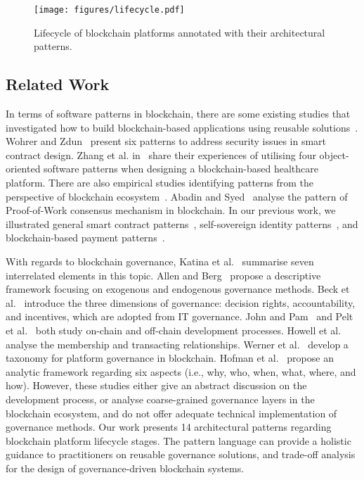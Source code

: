 \documentclass{article}
\begin{document}
\begin{figure*}[!ht]
	\centering
	\texttt{[image: figures/lifecycle.pdf]}
	\caption{Lifecycle of blockchain platforms annotated with their architectural patterns.}
	\label{fig:lifecycle}
\end{figure*}



\subsection{Related Work}

In terms of software patterns in blockchain, there are some existing studies that investigated how to build blockchain-based applications using reusable solutions~\cite{xu2018pattern, oracle, eberhardt2017or}. Wohrer and Zdun~\cite{wohrer2018smart} present six patterns to address security issues in smart contract design. Zhang et al. in~\cite{zhang2017applying} share their experiences of utilising four object-oriented software patterns when designing a blockchain-based healthcare platform. There are also empirical studies identifying patterns from the perspective of blockchain ecosystem~\cite{bartoletti2017empirical, Wohrer_Zdun}. Abadin and Syed~\cite{PoW_pattern} analyse the pattern of Proof-of-Work consensus mechanism in blockchain. In our previous work, we illustrated general smart contract patterns~\cite{smartContractICBC}, self-sovereign identity patterns~\cite{SSIpattern}, and blockchain-based payment patterns~\cite{lu2021patterns}.


With regards to blockchain governance, Katina et al.~\cite{selected5} summarise seven interrelated elements in this topic. Allen and Berg~\cite{selected7} propose a descriptive framework focusing on exogenous and endogenous governance methods. Beck et al.~\cite{selected14} introduce the three dimensions of governance: decision rights, accountability, and incentives, which are adopted from IT governance. John and Pam~\cite{selected10} and Pelt et al.~\cite{selected11} both study on-chain and off-chain development processes. Howell et al.~\cite{selected15} analyse the membership and transacting relationships. Werner et al.~\cite{selected31} develop a taxonomy for platform governance in blockchain. Hofman et al.~\cite{hofman2021blockchain} propose an analytic framework regarding six aspects (i.e., why, who, when, what, where, and how). However, these studies either give an abstract discussion on the development process, or analyse coarse-grained governance layers in the blockchain ecosystem, and do not offer adequate technical implementation of governance methods. Our work presents 14 architectural patterns regarding blockchain platform lifecycle stages. The pattern language can provide a holistic guidance to practitioners on reusable governance solutions, and trade-off analysis for the design of governance-driven blockchain systems.
\end{document}
